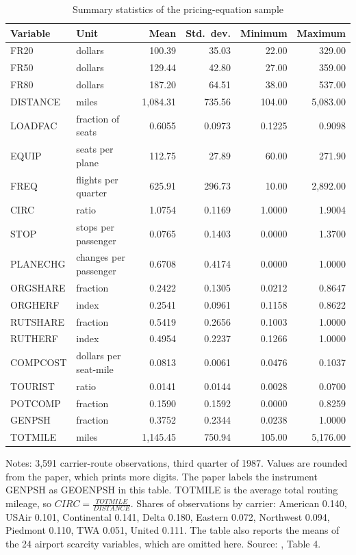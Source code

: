 \begin{table}[htbp]
\centering
\caption{Summary statistics of the pricing-equation sample}
\label{tab:09-bor-desc}
\footnotesize
\begin{tabular}{@{}llrrrr@{}}
\toprule
Variable & Unit & Mean & Std.\ dev. & Minimum & Maximum \\
\midrule
FR20 & dollars & 100.39 & 35.03 & 22.00 & 329.00 \\
FR50 & dollars & 129.44 & 42.80 & 27.00 & 359.00 \\
FR80 & dollars & 187.20 & 64.51 & 38.00 & 537.00 \\
DISTANCE & miles & 1,084.31 & 735.56 & 104.00 & 5,083.00 \\
LOADFAC & fraction of seats & 0.6055 & 0.0973 & 0.1225 & 0.9098 \\
EQUIP & seats per plane & 112.75 & 27.89 & 60.00 & 271.90 \\
FREQ & flights per quarter & 625.91 & 296.73 & 10.00 & 2,892.00 \\
CIRC & ratio & 1.0754 & 0.1169 & 1.0000 & 1.9004 \\
STOP & stops per passenger & 0.0765 & 0.1403 & 0.0000 & 1.3700 \\
PLANECHG & changes per passenger & 0.6708 & 0.4174 & 0.0000 & 1.0000 \\
ORGSHARE & fraction & 0.2422 & 0.1305 & 0.0212 & 0.8647 \\
ORGHERF & index & 0.2541 & 0.0961 & 0.1158 & 0.8622 \\
RUTSHARE & fraction & 0.5419 & 0.2656 & 0.1003 & 1.0000 \\
RUTHERF & index & 0.4954 & 0.2237 & 0.1266 & 1.0000 \\
COMPCOST & dollars per seat-mile & 0.0813 & 0.0061 & 0.0476 & 0.1037 \\
TOURIST & ratio & 0.0141 & 0.0144 & 0.0028 & 0.0700 \\
POTCOMP & fraction & 0.1590 & 0.1592 & 0.0000 & 0.8259 \\
GENPSH & fraction & 0.3752 & 0.2344 & 0.0238 & 1.0000 \\
TOTMILE & miles & 1,145.45 & 750.94 & 105.00 & 5,176.00 \\
\bottomrule
\end{tabular}

\smallskip
\begin{minipage}{0.92\linewidth}
\footnotesize Notes: 3,591 carrier-route observations, third quarter of 1987. Values are rounded from the
paper, which prints more digits. The paper labels the instrument GENPSH as GEOENPSH in this table. TOTMILE is
the average total routing mileage, so $\mathit{CIRC} = \frac{\mathit{TOTMILE}}{\mathit{DISTANCE}}$. Shares of
observations by carrier: American 0.140, USAir 0.101, Continental 0.141, Delta 0.180, Eastern 0.072, Northwest
0.094, Piedmont 0.110, TWA 0.051, United 0.111. The table also reports the means of the 24 airport scarcity
variables, which are omitted here. Source: \citet{Borenstein1989}, Table 4.
\end{minipage}
\end{table}

